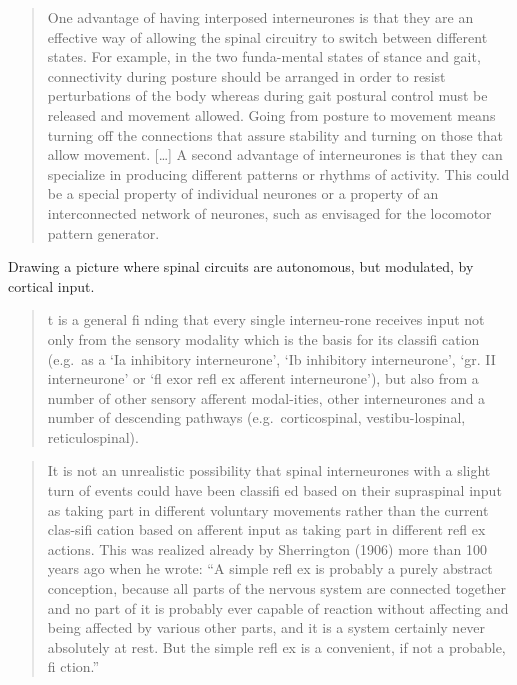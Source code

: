 \begin{quote}
One advantage of having interposed interneurones is that they are an
effective way of allowing the spinal circuitry to switch between
different states. For example, in the two funda-mental states of stance
and gait, connectivity during posture should be arranged in order to
resist perturbations of the body whereas during gait postural control
must be released and movement allowed. Going from posture to movement
means turning off the connections that assure stability and turning on
those that allow movement. {[}\ldots{]} A second advantage of
interneurones is that they can specialize in producing different
patterns or rhythms of activity. This could be a special property of
individual neurones or a property of an interconnected network of
neurones, such as envisaged for the locomotor pattern generator.
\end{quote}

Drawing a picture where spinal circuits are autonomous, but modulated,
by cortical input.

\begin{quote}
t is a general fi nding that every single interneu-rone receives input
not only from the sensory modality which is the basis for its classifi
cation (e.g.~as a `Ia inhibitory interneurone', `Ib inhibitory
interneurone', `gr. II interneurone' or `fl exor refl ex afferent
interneurone'), but also from a number of other sensory afferent
modal-ities, other interneurones and a number of descending pathways
(e.g.~corticospinal, vestibu-lospinal, reticulospinal).
\end{quote}

\begin{quote}
It is not an unrealistic possibility that spinal interneurones with a
slight turn of events could have been classifi ed based on their
supraspinal input as taking part in different voluntary movements rather
than the current clas-sifi cation based on afferent input as taking part
in different refl ex actions. This was realized already by Sherrington
(1906) more than 100 years ago when he wrote: ``A simple refl ex is
probably a purely abstract conception, because all parts of the nervous
system are connected together and no part of it is probably ever capable
of reaction without affecting and being affected by various other parts,
and it is a system certainly never absolutely at rest. But the simple
refl ex is a convenient, if not a probable, fi ction.''
\end{quote}

